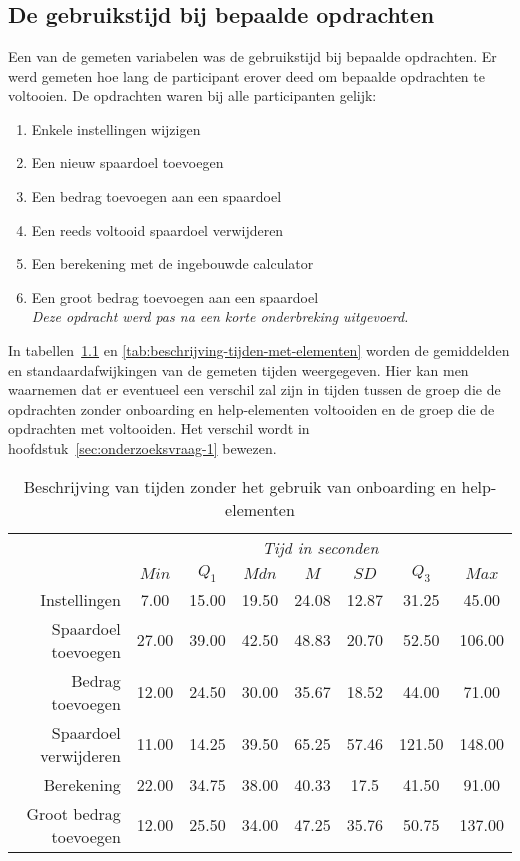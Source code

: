 \chapter{}
\label{ch:metingen}

\section{De gebruikstijd bij bepaalde opdrachten}
\label{sec:gebruikstijd}

Een van de gemeten variabelen was de gebruikstijd bij bepaalde opdrachten. Er werd gemeten hoe lang de participant erover deed om bepaalde opdrachten te voltooien. De opdrachten waren bij alle participanten gelijk:
\begin{enumerate}
    \item Enkele instellingen wijzigen
    \item Een nieuw spaardoel toevoegen
    \item Een bedrag toevoegen aan een spaardoel
    \item Een reeds voltooid spaardoel verwijderen
    \item Een berekening met de ingebouwde calculator
    \item Een groot bedrag toevoegen aan een spaardoel\\\textit{Deze opdracht werd pas na een korte onderbreking uitgevoerd.}
\end{enumerate}

In tabellen~\ref{tab:beschrijving-tijden-zonder-elementen} en \ref{tab:beschrijving-tijden-met-elementen} worden de gemiddelden en standaardafwijkingen van de gemeten tijden weergegeven. Hier kan men waarnemen dat er eventueel een verschil zal zijn in tijden tussen de groep die de opdrachten zonder onboarding en help-elementen voltooiden en de groep die de opdrachten met voltooiden. Het verschil wordt in hoofdstuk~\ref{sec:onderzoeksvraag-1} bewezen.

\begin{table}[]
	\centering
	\begin{tabular}{r|ccccccc}
		\multicolumn{1}{l|}{} & \multicolumn{7}{c}{\textit{Tijd in seconden}} \\
		& $Min$ & $Q_1$ & $Mdn$ & $M$ & $SD$ & $Q_3$ & $Max$ \\ \hline
		Instellingen & 7.00 & 15.00 & 19.50 & 24.08 & 12.87 & 31.25 & 45.00 \\
		Spaardoel toevoegen & 27.00 & 39.00 & 42.50 & 48.83 & 20.70 & 52.50 & 106.00 \\
		Bedrag toevoegen & 12.00 & 24.50 & 30.00 & 35.67 & 18.52 & 44.00 & 71.00 \\
		Spaardoel verwijderen & 11.00 & 14.25 & 39.50 & 65.25 & 57.46 & 121.50 & 148.00 \\
		Berekening & 22.00 & 34.75 & 38.00 & 40.33 & 17.5 & 41.50 & 91.00 \\
		Groot bedrag toevoegen & 12.00 & 25.50 & 34.00 & 47.25 & 35.76 & 50.75 & 137.00
	\end{tabular}
	\caption{Beschrijving van tijden zonder het gebruik van onboarding en help-elementen}
	\label{tab:beschrijving-tijden-zonder-elementen}
\end{table}

